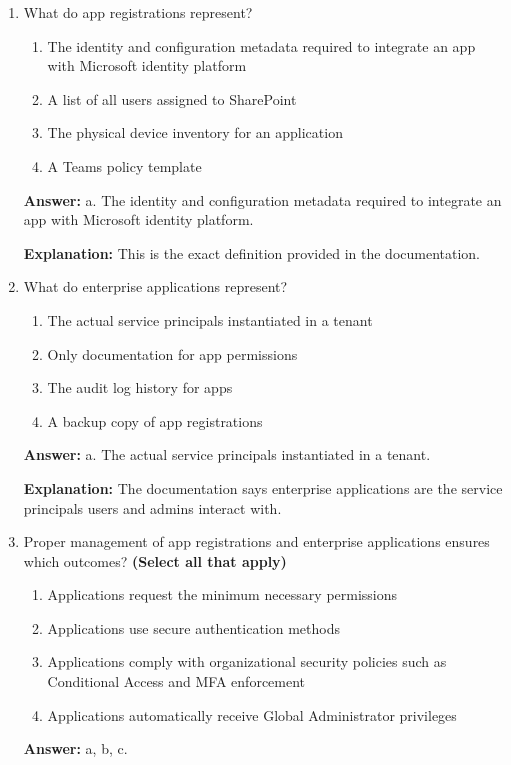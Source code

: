 \documentclass[10pt]{article}
\begin{document}
\begin{enumerate}[leftmargin=*]
\textbf{Explanation:} The documentation explicitly states that Microsoft Entra separates app registrations and enterprise applications.

\item What do app registrations represent?
\begin{enumerate}[label=\alph*., leftmargin=1.5em]
\item The identity and configuration metadata required to integrate an app with Microsoft identity platform
\item A list of all users assigned to SharePoint
\item The physical device inventory for an application
\item A Teams policy template
\end{enumerate}
\textbf{Answer:} a. The identity and configuration metadata required to integrate an app with Microsoft identity platform.

\textbf{Explanation:} This is the exact definition provided in the documentation.

\item What do enterprise applications represent?
\begin{enumerate}[label=\alph*., leftmargin=1.5em]
\item The actual service principals instantiated in a tenant
\item Only documentation for app permissions
\item The audit log history for apps
\item A backup copy of app registrations
\end{enumerate}
\textbf{Answer:} a. The actual service principals instantiated in a tenant.

\textbf{Explanation:} The documentation says enterprise applications are the service principals users and admins interact with.

\item Proper management of app registrations and enterprise applications ensures which outcomes? \textbf{(Select all that apply)}
\begin{enumerate}[label=\alph*., leftmargin=1.5em]
\item Applications request the minimum necessary permissions
\item Applications use secure authentication methods
\item Applications comply with organizational security policies such as Conditional Access and MFA enforcement
\item Applications automatically receive Global Administrator privileges
\end{enumerate}
\textbf{Answer:} a, b, c.


\end{enumerate}
\end{document}

